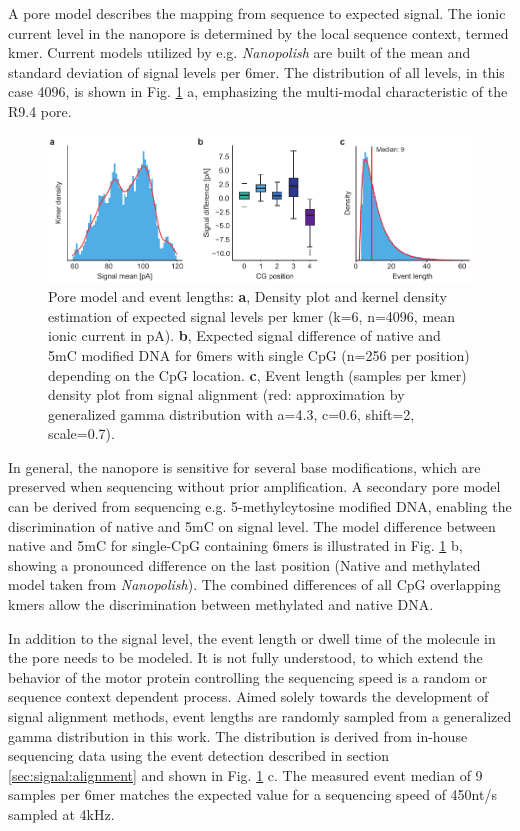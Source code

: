 A pore model describes the mapping from sequence to expected signal. The ionic current level in the nanopore is determined by the local sequence context, termed kmer. Current models utilized by e.g. \textit{Nanopolish} are built of the mean and standard deviation of signal levels per 6mer. The distribution of all levels, in this case 4096, is shown in Fig. \ref{fig:signal:pm} a, emphasizing the multi-modal characteristic of the R9.4 pore.

\begin{figure}[h]
	\centering
	\includegraphics[width=1.0\textwidth]{figures/signal/pm.pdf}
	\captionsetup{format=plain}
	\caption[Pore model and event length]{Pore model and event lengths: \textbf{a}, Density plot and kernel density estimation of expected signal levels per kmer (k=6, n=4096, mean ionic current in pA). \textbf{b}, Expected signal difference of native and 5mC modified DNA for 6mers with single CpG (n=256 per position) depending on the CpG location. \textbf{c}, Event length (samples per kmer) density plot from signal alignment (red: approximation by generalized gamma distribution with a=4.3, c=0.6, shift=2, scale=0.7).}
	\label{fig:signal:pm}
\end{figure}

In general, the nanopore is sensitive for several base modifications, which are preserved when sequencing without prior amplification. A secondary pore model can be derived from sequencing e.g. 5-methylcytosine modified DNA, enabling the discrimination of native and 5mC on signal level. The model difference between native and 5mC for single-CpG containing 6mers is illustrated in Fig. \ref{fig:signal:pm} b, showing a pronounced difference on the last position (Native and methylated model taken from \textit{Nanopolish}). The combined differences of all CpG overlapping kmers allow the discrimination between methylated and native DNA.

In addition to the signal level, the event length or dwell time of the molecule in the pore needs to be modeled. It is not fully understood, to which extend the behavior of the motor protein controlling the sequencing speed is a random or sequence context dependent process. Aimed solely towards the development of signal alignment methods, event lengths are randomly sampled from a generalized gamma distribution in this work. 
The distribution is derived from in-house sequencing data using the event detection described in section \ref{sec:signal:alignment} and shown in Fig. \ref{fig:signal:pm} c. The measured event median of 9 samples per 6mer matches the expected value for a sequencing speed of 450nt/s sampled at 4kHz.

